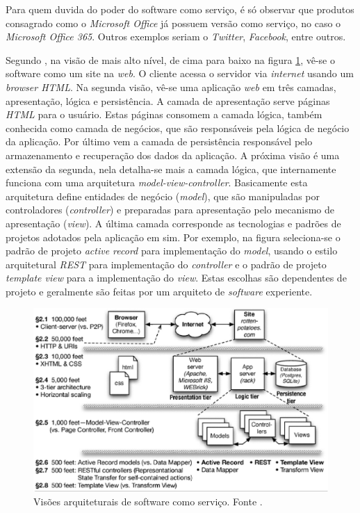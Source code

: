 	Para quem duvida do poder do software como serviço, é só observar que produtos consagrado como o \emph{Microsoft Office} já possuem versão como serviço, no caso o \emph{Microsoft Office 365}. Outros exemplos seriam o \emph{Twitter}, \emph{Facebook}, entre outros.
	

Segundo , na visão de mais alto nível, de cima para baixo na figura \ref{saas_view}, vê-se o software como um site na \emph{web}. 
O cliente acessa o servidor via \emph{internet} usando um \emph{browser HTML}. 
Na segunda visão, vê-se uma aplicação \emph{web} em três camadas, apresentação, lógica e persistência.
A camada de apresentação serve páginas \emph{HTML} para o usuário. Estas páginas consomem a camada lógica, também conhecida como camada de negócios, que são responsáveis pela lógica de negócio da aplicação. Por último vem a camada de persistência responsável pelo armazenamento e recuperação dos dados da aplicação.
A próxima visão é uma extensão da segunda, nela detalha-se mais a camada lógica, que internamente funciona com uma arquitetura \emph{model-view-controller}. 
Basicamente esta arquitetura define entidades de negócio (\emph{model}), que são manipuladas por controladores (\emph{controller}) e preparadas para apresentação pelo mecanismo de apresentação (\emph{view}).
A última camada corresponde as tecnologias e padrões de projetos adotados pela aplicação em sim. Por exemplo, na figura seleciona-se o padrão de projeto \emph{active record} para implementação do \emph{model},  usando o estilo arquitetural \emph{REST} para implementação do \emph{controller} e o padrão de projeto \emph{template view} para a implementação do \emph{view}. Estas escolhas são dependentes de projeto e geralmente são feitas por um arquiteto de \emph{software} experiente. 

\begin{figure}[ht]
	\centering
	\includegraphics[width=15 cm]{figuras/saas_view.eps}
	\caption{Visões arquiteturais de software como serviço. Fonte \cite{Fox2012}.}
    	\label{saas_view}
\end{figure}


